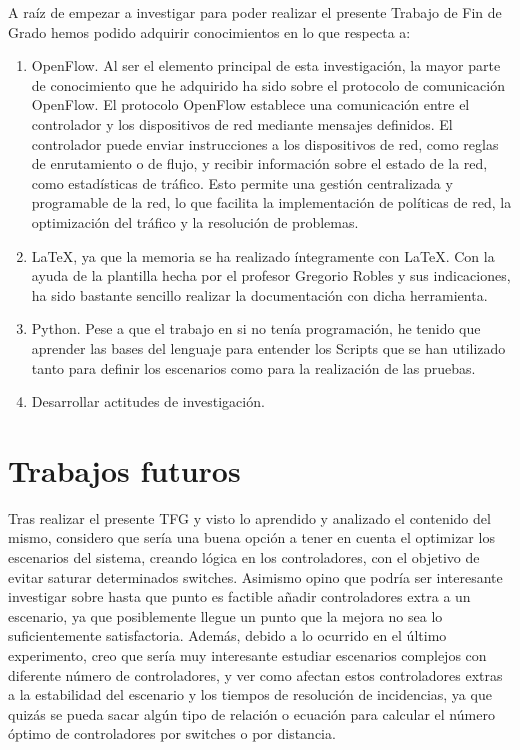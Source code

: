 \documentclass[a4paper, 12pt]{book}
\begin{document}
	A raíz de empezar a investigar para poder realizar el presente Trabajo de Fin de Grado hemos podido adquirir conocimientos en lo que respecta a:
	
	\begin{enumerate}
		\item OpenFlow. Al ser el elemento principal de esta investigación, la mayor parte de conocimiento que he adquirido ha sido sobre el protocolo de comunicación OpenFlow. El protocolo OpenFlow establece una comunicación entre el controlador y los dispositivos de red mediante mensajes definidos. El controlador puede enviar instrucciones a los dispositivos de red, como reglas de enrutamiento o de flujo, y recibir información sobre el estado de la red, como estadísticas de tráfico. Esto permite una gestión centralizada y programable de la red, lo que facilita la implementación de políticas de red, la optimización del tráfico y la resolución de problemas.
		\item LaTeX, ya que la memoria se ha realizado íntegramente con LaTeX. Con la ayuda de la plantilla hecha por el profesor Gregorio Robles y sus indicaciones, ha sido bastante sencillo realizar la documentación con dicha herramienta.
		\item Python. Pese a que el trabajo en si no tenía programación, he tenido que aprender las bases del lenguaje para entender los Scripts que se han utilizado tanto para definir los escenarios como para la realización de las pruebas.
		\item Desarrollar actitudes de investigación.
		
	\end{enumerate}
	
	
	\section{Trabajos futuros}
	\label{sec:trabajos_futuros}
	
	Tras realizar el presente TFG y visto lo aprendido y analizado el contenido del mismo, considero que sería una buena opción a tener en cuenta el optimizar los escenarios del sistema, creando lógica en los controladores, con el objetivo de evitar saturar determinados switches. Asimismo opino que podría ser interesante investigar sobre hasta que punto es factible añadir controladores extra a un escenario, ya que posiblemente llegue un punto que la mejora no sea lo suficientemente satisfactoria. 
	Además, debido a lo ocurrido en el último experimento, creo que sería muy interesante estudiar escenarios complejos con diferente número de controladores, y ver como afectan estos controladores extras a la estabilidad del escenario y los tiempos de resolución de incidencias, ya que quizás se pueda sacar algún tipo de relación o ecuación para calcular el número óptimo de controladores por switches o por distancia.
	
\end{document}

